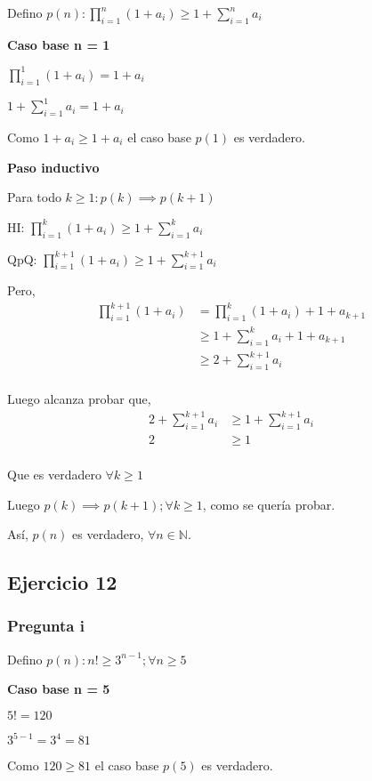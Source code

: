 Defino $ p(n): \prod_{i=1}^{n}(1+a_i)\geq 1+\sum_{i=1}^{n}a_i $

\textbf{Caso base n = 1}

$ \prod_{i=1}^{1}(1+a_i) = 1 + a_i $

$ 1+\sum_{i=1}^{1}a_i = 1+a_i $

Como $ 1 + a_i \geq 1 + a_i $ el caso base $p(1)$ es verdadero.

\textbf{Paso inductivo}

Para todo $k \geq 1: p(k) \implies p(k+1)$

HI: $\prod_{i=1}^{k}(1+a_i) \geq 1+\sum_{i=1}^{k}a_i$

QpQ: $ \prod_{i=1}^{k+1}(1+a_i) \geq 1+\sum_{i=1}^{k+1}a_i$

Pero,
\begin{align*}
    \prod_{i=1}^{k+1}(1+a_i) &= \prod_{i=1}^{k}(1+a_i) + 1+a_{k+1} \\
    &\geq 1+\sum_{i=1}^{k}a_i + 1+a_{k+1} \\
    &\geq 2+\sum_{i=1}^{k+1}a_i \\
\end{align*}

Luego alcanza probar que,
\begin{align*}
    2+\sum_{i=1}^{k+1}a_i &\geq 1+\sum_{i=1}^{k+1}a_i \\
    2 &\geq 1 \\
\end{align*}

Que es verdadero $\forall k \geq 1$

Luego $p(k) \implies p(k+1); \forall k \geq 1$, como se quería probar.

Así, $p(n)$ es verdadero, $\forall n \in \mathbb{N}$.

\subsection{Ejercicio 12}

\subsubsection{Pregunta i}

Defino $ p(n): n! \geq 3^{n-1}; \forall n \geq 5 $

\textbf{Caso base n = 5}

$ 5! = 120 $

$ 3^{5-1} = 3^4 = 81$

Como $ 120 \geq 81 $ el caso base $p(5)$ es verdadero.

